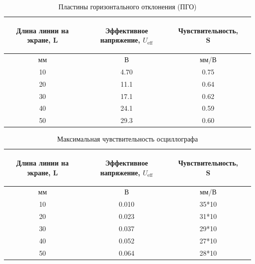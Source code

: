 \begin{center}
\begin{table}[H]
\centering
\caption{Пластины горизонтального отклонения (ПГО)}
\label{tabl:1}
\begin{tabular}{|c|c|c|c|}
\hline
\begin{minipage}{5cm}
\begin{center}
    Длина линии на экране, L
\end{center}
\end{minipage} &
\begin{minipage}{5cm}
\begin{center}
    Эффективное напряжение, $U_{\text{eff}}$
\end{center}
\end{minipage} &
\begin{minipage}{5cm}
\begin{center}
    Чувствительность, S
\end{center}
\end{minipage}\\
\hline
мм&В&мм/В\\
\hline
10  &  4.70  &  0.75 \\
20  &  11.1  &  0.64 \\
30  &  17.1  &  0.62 \\
40  &  24.1  &  0.59 \\
50  &  29.3  &  0.60 \\
\hline
\end{tabular}
\end{table}
\end{center}

\begin{center}
\begin{table}[h!]
\centering
\caption{Максимальная чувствительность осциллографа}
\label{tabl:1}
\begin{tabular}{|c|c|c|c|}
\hline
\begin{minipage}{5cm}
\begin{center}
    Длина линии на экране, L
\end{center}
\end{minipage} &
\begin{minipage}{5cm}
\begin{center}
    Эффективное напряжение, $U_{\text{eff}}$
\end{center}
\end{minipage} &
\begin{minipage}{5cm}
\begin{center}
    Чувствительность, S
\end{center}
\end{minipage}\\
\hline
мм&В&мм/В\\
\hline
10  &  0.010  &  35*10 \\
20  &  0.023  &  31*10 \\
30  &  0.037  &  29*10 \\
40  &  0.052  &  27*10 \\
50  &  0.064  &  28*10 \\
\hline
\end{tabular}
\end{table}
\end{center}

